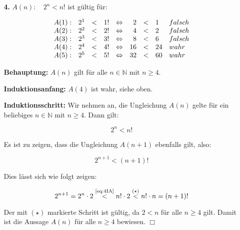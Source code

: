\documentclass[a4paper,10pt]{scrartcl}
\begin{document}
\begin{enumerate}
\begin{enumerate}
        \end{enumerate}

    \vspace{2cm}

    \item[\textbf{4.}]
        $A(n): \hspace{1em}2^n < n!$ ist gültig für:

        $$\begin{array}{l rcl c rcl l}
            A(1): & 2^1 &<& 1! &\Leftrightarrow&  2 &<&  1 & falsch\\
            A(2): & 2^2 &<& 2! &\Leftrightarrow&  4 &<&  2 & falsch\\
            A(3): & 2^3 &<& 3! &\Leftrightarrow&  8 &<&  6 & falsch\\
            A(4): & 2^4 &<& 4! &\Leftrightarrow& 16 &<& 24 & wahr\\
            A(5): & 2^5 &<& 5! &\Leftrightarrow& 32 &<& 60 & wahr\\
        \end{array}$$

        \textbf{Behauptung:} $A(n)$ gilt für alle $n \in \mathbb{N}$ mit $n \geq 4$.

        \textbf{Induktionsanfang:} $A(4)$ ist wahr, siehe oben.

        \textbf{Induktionsschritt:} Wir nehmen an, die Ungleichung $A(n)$ gelte für ein beliebiges
        $n \in \mathbb{N}$ mit $n \geq 4$. Dann gilt:

        \begin{equation}\label{eq:4IA}\tag{IA}
            2^n < n!
        \end{equation}

        Es ist zu zeigen, dass die Ungleichung $A(n + 1)$ ebenfalls gilt, also:

        \begin{equation}\label{eq:4IS1}
            2^{n+1} < (n+1)!
        \end{equation}

        Dies lässt sich wie folgt zeigen:

        \begin{equation}\label{eq:4IS2}
            2^{n+1} = 2^n \cdot 2 \overset{\text{\scriptsize\eqref{eq:4IA}}}{<}
            n! \cdot 2 \overset{(\star)}{<} n! \cdot n = (n+1)!
        \end{equation}

        Der mit $(\star)$ markierte Schritt ist gültig, da $2 < n$ für alle $n \geq 4$ gilt. Damit ist die Aussage
        $A(n)$ für alle $n \geq 4$ bewiesen. $\Box$

\end{enumerate}
\end{document}
